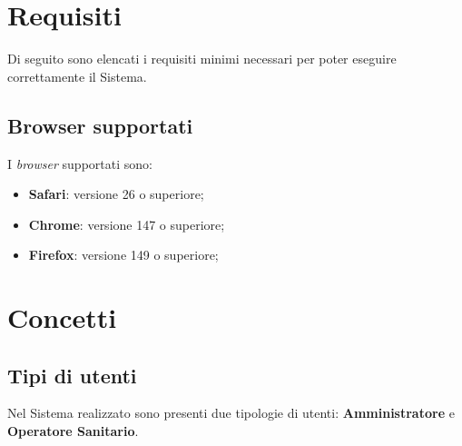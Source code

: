 \documentclass[10pt, letterpaper]{article}
\newcommand{\os}{Operatore Sanitario\xspace}
\newcommand{\admin}{Amministratore\xspace}
\begin{document}
\makeTitlePage

\newpage 
{}
\makeChangelog

\newpage

\tableofcontents

\newpage

\listoffigures

\newpage


\section{Requisiti}
\label{sec:requisiti}

Di seguito sono elencati i requisiti minimi necessari per poter eseguire correttamente il Sistema.

\subsection{Browser supportati}
\label{sec:browsers}

I \textit{browser} supportati sono:

\begin{itemize}
    \item   \textbf{Safari}: versione 26 o superiore;
    \item   \textbf{Chrome}: versione 147 o superiore;
    \item   \textbf{Firefox}: versione 149 o superiore;
\end{itemize}

\newpage

\section{Concetti}

\subsection{Tipi di utenti}
Nel Sistema realizzato sono presenti due tipologie di utenti: \textbf{\admin} e \textbf{\os}.
\end{document}
